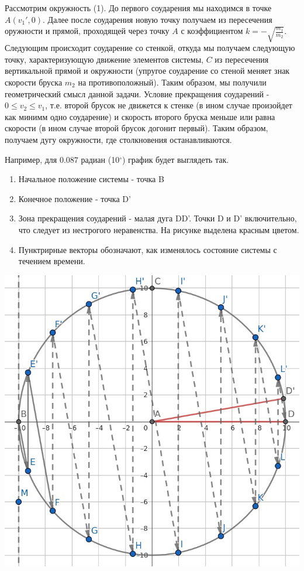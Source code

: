 \documentclass[a4paper,12pt]{article} %
\begin{document}
Рассмотрим окружность (1). До первого соударения мы находимся в точке $A(v_1', 0)$. Далее после соударения новую точку получаем из пересечения оружности и прямой, проходящей через точку $A$ с коэффициентом $k = -\sqrt{\frac{m_1}{m_2}}$. Следующим происходит соударение со стенкой, откуда мы получаем следующую точку, характеризующую движение элементов системы, $C$ из пересечения вертикальной прямой и окружности (упругое соударение со стеной меняет знак скорости бруска $m_2$ на противоположный). Таким образом, мы получили геометрический смысл данной задачи. Условие прекращения соударений - $0 \leq v_2 \leq v_1$, т.е. второй брусок не движется к стенке (в ином случае произойдет как минимм одно соударение) и скорость второго бруска меньше или равна скорости (в ином случае второй брусок догонит первый). Таким образом, получаем дугу окружности, где столкновения останавливаются.

\bigskip

\begin{minipage}{0.5\textwidth}
Например, для $0.087$ радиан (10$^\circ$) график будет выглядеть так. 
\begin{enumerate}
    \item Начальное положение системы - точка B
    \item Конечное положение - точка D'
    \item Зона прекращения соударений - малая дуга DD'. Точки D и D' включительно, что следует из нестрогого неравенства. На рисунке выделена красным цветом.
    \item Пунктрирные векторы обозначают, как изменялось состояние системы с течением времени.
\end{enumerate}
\end{minipage}
\begin{minipage}{0.55\textwidth}
\begin{center}
    \includegraphics[width=0.65\linewidth]{CircleExample.jpg}
\end{center}
\end{minipage}
\end{document}
